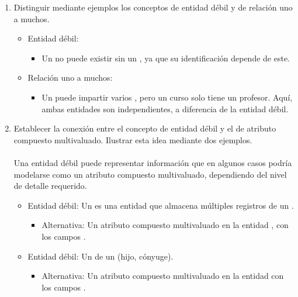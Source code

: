 \begin{enumerate}[label=\textbf{\arabic*.}, itemsep=0.5em]
        \item Distinguir mediante ejemplos los conceptos de entidad débil y de relación uno a muchos.  
        \begin{itemize}
            \item Entidad débil:
            \begin{itemize}
                \item Un  no puede existir sin un , ya que su identificación depende de este.
            \end{itemize}
            \item Relación uno a muchos:
            \begin{itemize}
                \item Un  puede impartir varios , pero un curso solo tiene un profesor. Aquí, ambas entidades son independientes, a diferencia de la entidad débil.
            \end{itemize}
        \end{itemize}
        
        \item Establecer la conexión entre el concepto de entidad débil y el de atributo compuesto multivaluado. Ilustrar esta idea mediante dos ejemplos. \\\\ 
        Una entidad débil puede representar información que en algunos casos podría modelarse como un atributo compuesto multivaluado, dependiendo del nivel de detalle requerido.
        
        \begin{itemize}
            \item Entidad débil: Un  es una entidad que almacena múltiples registros de un .
            \begin{itemize}
                \item Alternativa: Un atributo compuesto multivaluado  en la entidad , con los campos .
            \end{itemize}
            \item Entidad débil: Un  de un  (hijo, cónyuge).
            \begin{itemize}
                \item Alternativa: Un atributo compuesto multivaluado  en la entidad  con los campos .
            \end{itemize}
        \end{itemize}
        

\end{enumerate}
